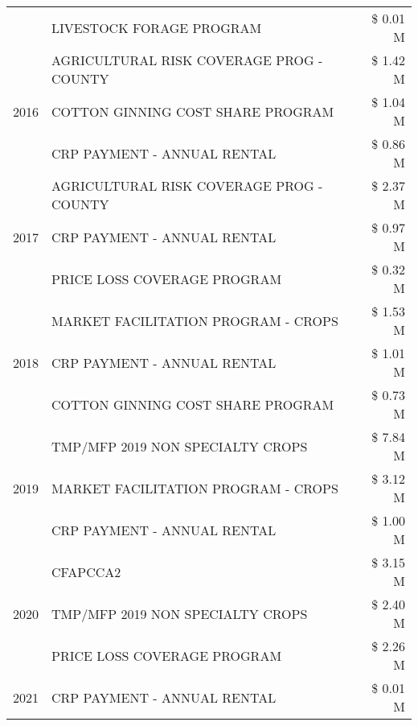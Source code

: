 \begin{tabular}{llr}
 & LIVESTOCK FORAGE PROGRAM & \$ 0.01 M \\
\cline{1-3}
\multirow[t]{3}{*}{2016} & AGRICULTURAL RISK COVERAGE PROG - COUNTY & \$ 1.42 M \\
 & COTTON GINNING COST SHARE PROGRAM & \$ 1.04 M \\
 & CRP PAYMENT - ANNUAL RENTAL & \$ 0.86 M \\
\cline{1-3}
\multirow[t]{3}{*}{2017} & AGRICULTURAL RISK COVERAGE PROG - COUNTY & \$ 2.37 M \\
 & CRP PAYMENT - ANNUAL RENTAL & \$ 0.97 M \\
 & PRICE LOSS COVERAGE PROGRAM & \$ 0.32 M \\
\cline{1-3}
\multirow[t]{3}{*}{2018} & MARKET FACILITATION PROGRAM - CROPS & \$ 1.53 M \\
 & CRP PAYMENT - ANNUAL RENTAL & \$ 1.01 M \\
 & COTTON GINNING COST SHARE PROGRAM & \$ 0.73 M \\
\cline{1-3}
\multirow[t]{3}{*}{2019} & TMP/MFP 2019 NON SPECIALTY CROPS & \$ 7.84 M \\
 & MARKET FACILITATION PROGRAM - CROPS & \$ 3.12 M \\
 & CRP PAYMENT - ANNUAL RENTAL & \$ 1.00 M \\
\cline{1-3}
\multirow[t]{3}{*}{2020} & CFAPCCA2 & \$ 3.15 M \\
 & TMP/MFP 2019 NON SPECIALTY CROPS & \$ 2.40 M \\
 & PRICE LOSS COVERAGE PROGRAM & \$ 2.26 M \\
\cline{1-3}
2021 & CRP PAYMENT - ANNUAL RENTAL & \$ 0.01 M \\
\cline{1-3}
\bottomrule
\end{tabular}
